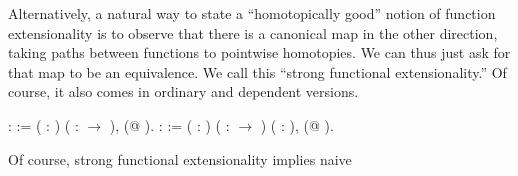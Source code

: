 \documentclass[12pt]{report}
\begin{document}
\begin{coqdoccode}
\coqdocemptyline
\end{coqdoccode}
Alternatively, a natural way to state a “homotopically good” notion of function
   extensionality is to observe that there is a canonical map in the
   other direction, taking paths between functions to pointwise
   homotopies.  We can thus just ask for that map to be an
   equivalence.  We call this “strong functional extensionality.”  Of
   course, it also comes in ordinary and dependent versions.  \begin{coqdoccode}
\coqdocemptyline
\coqdocnoindent
{}  :  :=\coqdoceol
\coqdocindent{1.00em}
\coqdockw{\ensuremath{\forall}} (  : ) (  :  \ensuremath{\rightarrow} ),  (@    ).\coqdoceol
\coqdocemptyline
\coqdocnoindent
{}  :  :=\coqdoceol
\coqdocindent{1.00em}
\coqdockw{\ensuremath{\forall}} ( : ) ( :  \ensuremath{\rightarrow} ) (  :  ),\coqdoceol
\coqdocindent{2.00em}
 (@    ).\coqdoceol
\coqdocemptyline
\end{coqdoccode}
Of course, strong functional extensionality implies naive
\end{document}
